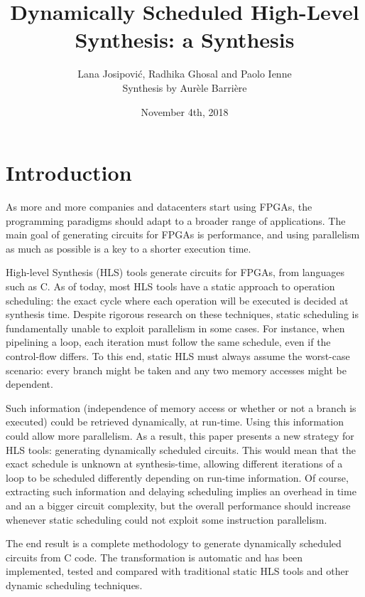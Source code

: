 \documentclass{article}
\title{Dynamically Scheduled High-Level Synthesis: a Synthesis}
\author{Lana Josipovi\'c, Radhika Ghosal and Paolo Ienne\\ Synthesis by Aur\`ele Barri\`ere}
\date{November 4th, 2018}
\begin{document}
\maketitle

\section{Introduction}
As more and more companies and datacenters start using FPGAs, the programming paradigms should adapt to a broader range of applications.
The main goal of generating circuits for FPGAs is performance, and using parallelism as much as possible is a key to a shorter execution time.

High-level Synthesis (HLS) tools generate circuits for FPGAs, from languages such as C.
As of today, most HLS tools have a static approach to operation scheduling: the exact cycle where each operation will be executed is decided at synthesis time.
Despite rigorous research on these techniques, static scheduling is fundamentally unable to exploit parallelism in some cases.
For instance, when pipelining a loop, each iteration must follow the same schedule, even if the control-flow differs. To this end, static HLS must always assume the worst-case scenario: every branch might be taken and any two memory accesses might be dependent.

Such information (independence of memory access or whether or not a branch is executed) could be retrieved dynamically, at run-time. Using this information could allow more parallelism.
As a result, this paper presents a new strategy for HLS tools: generating dynamically scheduled circuits.
This would mean that the exact schedule is unknown at synthesis-time, allowing different iterations of a loop to be scheduled differently depending on run-time information.
Of course, extracting such information and delaying scheduling implies an overhead in time and an a bigger circuit complexity, but the overall performance should increase whenever static scheduling could not exploit some instruction parallelism.

The end result is a complete methodology to generate dynamically scheduled circuits from C code. The transformation is automatic and has been implemented, tested and compared with traditional static HLS tools and other dynamic scheduling techniques.
\end{document}

